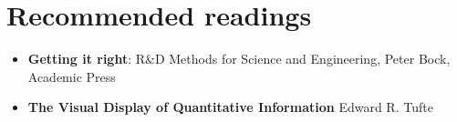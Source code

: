 \documentclass[a4paper,fleqn]{tufte-handout}
\begin{document}
\section{Recommended readings}

\begin{itemize}

\item \textbf{Getting it right}: R\&D Methods for Science and Engineering, Peter Bock, Academic Press

\item \textbf{The Visual Display of Quantitative Information} Edward R. Tufte

\end{itemize}











\end{document}
